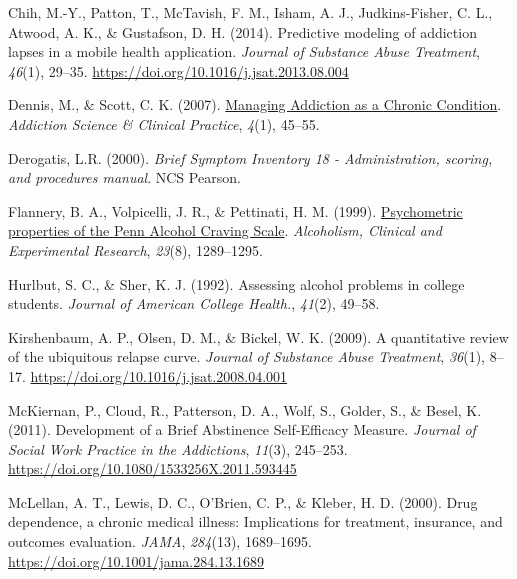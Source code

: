 \documentclass[
  letterpaper,
  DIV=11,
  numbers=noendperiod]{scrartcl}
\newlength{\cslhangindent}
\newenvironment{CSLReferences}[2] %
 {\begin{list}{}{%
  \setlength{\itemindent}{0pt}
  \setlength{\leftmargin}{0pt}
  \setlength{\parsep}{0pt}
  \ifodd #1
   \setlength{\leftmargin}{\cslhangindent}
   \setlength{\itemindent}{-1\cslhangindent}
  \fi
  \setlength{\itemsep}{#2\baselineskip}}}
 {\end{list}}
\begin{document}
\label{refs}
\begin{CSLReferences}{1}{0}
Chih, M.-Y., Patton, T., McTavish, F. M., Isham, A. J., Judkins-Fisher,
C. L., Atwood, A. K., \& Gustafson, D. H. (2014). Predictive modeling of
addiction lapses in a mobile health application. \emph{Journal of
Substance Abuse Treatment}, \emph{46}(1), 29--35.
\url{https://doi.org/10.1016/j.jsat.2013.08.004}

Dennis, M., \& Scott, C. K. (2007).
\href{https://www.ncbi.nlm.nih.gov/pmc/articles/PMC2797101}{Managing
{Addiction} as a {Chronic Condition}}. \emph{Addiction Science \&
Clinical Practice}, \emph{4}(1), 45--55.

Derogatis, L.R. (2000). \emph{Brief {Symptom Inventory} 18 -
{Administration}, scoring, and procedures manual}. NCS Pearson.

Flannery, B. A., Volpicelli, J. R., \& Pettinati, H. M. (1999).
\href{https://www.ncbi.nlm.nih.gov/pubmed/10470970}{Psychometric
properties of the {Penn Alcohol Craving Scale}}. \emph{Alcoholism,
Clinical and Experimental Research}, \emph{23}(8), 1289--1295.

Hurlbut, S. C., \& Sher, K. J. (1992). Assessing alcohol problems in
college students. \emph{Journal of American College Health.},
\emph{41}(2), 49--58.

Kirshenbaum, A. P., Olsen, D. M., \& Bickel, W. K. (2009). A
quantitative review of the ubiquitous relapse curve. \emph{Journal of
Substance Abuse Treatment}, \emph{36}(1), 8--17.
\url{https://doi.org/10.1016/j.jsat.2008.04.001}

McKiernan, P., Cloud, R., Patterson, D. A., Wolf, S., Golder, S., \&
Besel, K. (2011). Development of a {Brief Abstinence Self-Efficacy
Measure}. \emph{Journal of Social Work Practice in the Addictions},
\emph{11}(3), 245--253.
\url{https://doi.org/10.1080/1533256X.2011.593445}

McLellan, A. T., Lewis, D. C., O'Brien, C. P., \& Kleber, H. D. (2000).
Drug dependence, a chronic medical illness: Implications for treatment,
insurance, and outcomes evaluation. \emph{JAMA}, \emph{284}(13),
1689--1695. \url{https://doi.org/10.1001/jama.284.13.1689}


\end{CSLReferences}
\end{document}
